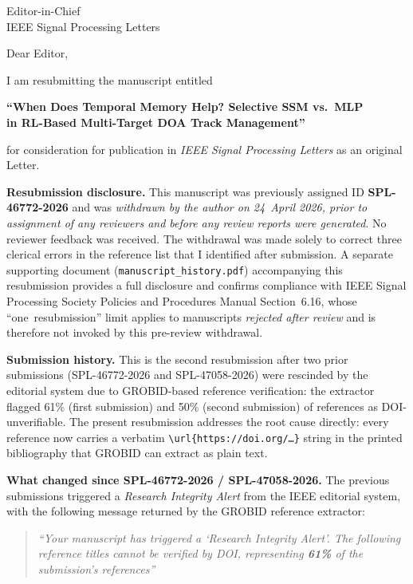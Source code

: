 \documentclass[11pt,a4paper]{letter}
\begin{document}
\begin{letter}{Editor-in-Chief\\
IEEE Signal Processing Letters}

\opening{Dear Editor,}

I am resubmitting the manuscript entitled

\begin{center}
\textbf{``When Does Temporal Memory Help? Selective SSM vs.\ MLP\\
in RL-Based Multi-Target DOA Track Management''}
\end{center}

for consideration for publication in \textit{IEEE Signal Processing
Letters} as an original Letter.

\medskip
\textbf{Resubmission disclosure.}
This manuscript was previously assigned ID \textbf{SPL-46772-2026} and
was \emph{withdrawn by the author on 24~April 2026, prior to assignment
of any reviewers and before any review reports were generated}. No
reviewer feedback was received. The withdrawal was made solely to
correct three clerical errors in the reference list that I identified
after submission. A separate supporting document
(\texttt{manuscript\_history.pdf}) accompanying this resubmission
provides a full disclosure and confirms compliance with IEEE Signal
Processing Society Policies and Procedures Manual Section~6.16, whose
``one~resubmission'' limit applies to manuscripts \emph{rejected after
review} and is therefore not invoked by this pre-review withdrawal.

\medskip
\textbf{Submission history.}
This is the second resubmission after two prior submissions
(SPL-46772-2026 and SPL-47058-2026) were rescinded by the
editorial system due to GROBID-based reference verification:
the extractor flagged 61\% (first submission) and 50\% (second
submission) of references as DOI-unverifiable. The present
resubmission addresses the root cause directly: every reference
now carries a verbatim \texttt{\textbackslash url\{https://doi.org/\ldots\}}
string in the printed bibliography that GROBID can extract as
plain text.

\medskip
\textbf{What changed since SPL-46772-2026 / SPL-47058-2026.}
The previous submissions triggered a
\emph{Research Integrity Alert} from the IEEE editorial system, with
the following message returned by the GROBID reference extractor:

\smallskip
\begin{quote}\itshape\small
``Your manuscript has triggered a `Research Integrity Alert'. The
following reference titles cannot be verified by DOI, representing
\textbf{61\%} of the submission's references''
\end{quote}
\smallskip


\end{letter}
\end{document}
